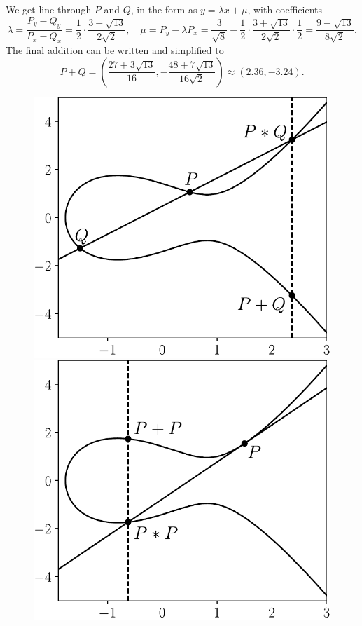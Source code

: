 \documentclass[openany, a4paper, 10pt]{book}
\theoremstyle{plain}
\theoremstyle{plain}
\theoremstyle{plain}
\theoremstyle{definition}
\theoremstyle{plain}
\theoremstyle{definition}
\theoremstyle{remark}
\begin{document}
\begin{examplebox}
    We get line through $P$ and $Q$, in the form as $y=\lambda x + \mu$, with coefficients
    \begin{equation*}
        \lambda = \frac{P_y-Q_y}{P_x-Q_x} = \frac{1}{2} \cdot \frac{3+\sqrt{13}}{2\sqrt{2}}, \quad
        \mu = P_y-\lambda P_x
          = \frac{3}{\sqrt{8}} - \frac{1}{2} \cdot \frac{3+\sqrt{13}}{2\sqrt{2}} \cdot \frac{1}{2}
          = \frac{9 - \sqrt{13}}{8\sqrt{2}}.
    \end{equation*}
    The final addition can be written and simplified to
    \begin{equation*}
        P+Q = \left(\frac{27+3\sqrt{13}}{16}, -\frac{48+7\sqrt{13}}{16\sqrt{2}}\right)
        \approx (2.36, -3.24).
    \end{equation*}
    \begin{figure}[H]
        \centering
        \vspace{-1em}
        \begin{minipage}{.5\textwidth}
            \centering
            \includegraphics[width=.9\textwidth]{../build_plots/elliptic_curve_example_addition}
        \end{minipage}%
        \begin{minipage}{.5\textwidth}
            \centering
            \includegraphics[width=.9\textwidth]{../build_plots/elliptic_curve_example_doubling}

\end{minipage}
\end{figure}
\end{examplebox}
\end{document}
